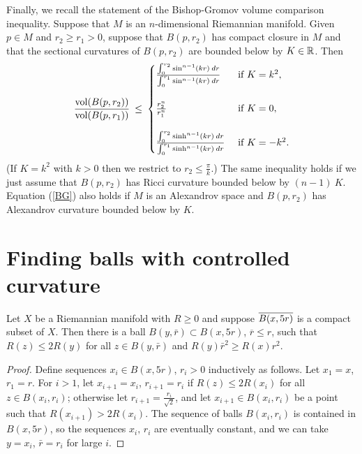 Finally, we recall the statement of the Bishop-Gromov volume
comparison inequality.  Suppose that $M$ is an
$n$-dimensional
Riemannian manifold.
Given $p \in M$ and $r_2 \ge r_1 > 0$,
suppose that $B(p, r_2)$ has compact closure in $M$ and that the
sectional curvatures of $B(p, r_2)$ are bounded below by
$K \in {\mathbb R}$. Then
\begin{equation} \label{BG}
\frac{\operatorname{vol}(B(p, r_2))}{\operatorname{vol}(B(p, r_1))} \: \le \:
\begin{cases}
\frac{\int_0^{r_2} \sin^{n-1}(kr) \: dr}{\int_0^{r_1} \sin^{n-1}(kr) \: dr}
& \text{ if } K = k^2, \\ \\
\frac{r_2^n}{r_1^n}
& \text{ if } K = 0, \\ \\
\frac{\int_0^{r_2} \sinh^{n-1}(kr) \: dr}{\int_0^{r_1} \sinh^{n-1}(kr) \: dr}
& \text{ if } K =  -  k^2.
\end{cases}
\end{equation}
(If $K = k^2$ with $k>0$ then we restrict to $r_2 \le \frac{\pi}{k}$.)
The same inequality holds if we just assume that
$B(p, r_2)$ has Ricci curvature bounded below by
$(n-1) \: K$. Equation (\ref{BG}) also holds if
$M$ is an Alexandrov space and $B(p, r_2)$ has Alexandrov curvature
bounded below by $K$.

\section{Finding balls with controlled curvature} \label{pointpicking}

\begin{lemma}
  \label{lem:kl-finding-balls-controlled-curvature-existence-curvature}

\label{selection}
Let $X$ be a Riemannian manifold
with $R \ge 0$
and suppose $\overline{B(x,5r)}$
is a compact subset of $X$.  Then there is a ball
$B(y,\bar r)\subset B(x,5r)$, $\overline{r} \le r$,
such that $R(z)\leq 2R(y)$
for all $z\in B(y,\bar r)$ and $R(y)\bar r^2\geq R(x)r^2$.
\end{lemma}
\begin{proof}
Define sequences $x_i\in B(x,5r)$, $r_i>0$
inductively as follows.  Let $x_1=x$, $r_1=r$.
For $i>1$, let $x_{i+1}=x_i$, $r_{i+1}=r_i$ if
$R(z)\leq 2R(x_i)$ for all $z\in B(x_i,r_i)$;
otherwise let $r_{i+1}=\frac{r_i}{\sqrt{2}}$, and let
$x_{i+1}\in B(x_i,r_i)$ be a point such that
$R(x_{i+1})>2R(x_i)$.  The sequence of balls
$B(x_i,r_i)$ is contained in $B(x,5r)$, so the
sequences $x_i,\,r_i$ are eventually constant,
and we can take $y=x_i$, $\bar r=r_i$ for large
$i$.
\end{proof}

